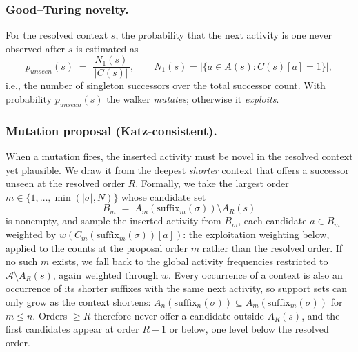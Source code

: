\documentclass[runningheads]{llncs}
\newcommand{\punseen}{\ensuremath{p_{\mathit{unseen}}}}
\begin{document}
\subsubsection{Good--Turing novelty.}
For the resolved context $s$, the probability that the next activity is one never observed after $s$ is estimated as
\begin{equation}
\punseen(s) \;=\; \frac{N_1(s)}{\,|C(s)|\,}, \qquad N_1(s) = |\{a \in A(s) : C(s)[a]=1\}|,
\label{eq:gt}
\end{equation}
i.e., the number of singleton successors over the total successor count. With probability $\punseen(s)$ the walker \emph{mutates}; otherwise it \emph{exploits}.

\subsubsection{Mutation proposal (Katz-consistent).}
When a mutation fires, the inserted activity must be novel in the resolved context yet plausible. We draw it from the deepest \emph{shorter} context that offers a successor unseen at the resolved order $R$. Formally, we take the largest order $m\in\{1,\dots,\min(|\sigma|,N)\}$ whose candidate set
\begin{equation}
B_m \;=\; A_m(\mathrm{suffix}_m(\sigma))\setminus A_R(s)
\label{eq:proposal}
\end{equation}
is nonempty, and sample the inserted activity from $B_m$, each candidate $a\in B_m$ weighted by $w(C_m(\mathrm{suffix}_m(\sigma))[a])$: the exploitation weighting below, applied to the counts at the proposal order $m$ rather than the resolved order. If no such $m$ exists, we fall back to the global activity frequencies restricted to $\mathcal{A}\setminus A_R(s)$, again weighted through $w$. Every occurrence of a context is also an occurrence of its shorter suffixes with the same next activity, so support sets can only grow as the context shortens: $A_n(\mathrm{suffix}_n(\sigma))\subseteq A_m(\mathrm{suffix}_m(\sigma))$ for $m\le n$. Orders $\ge R$ therefore never offer a candidate outside $A_R(s)$, and the first candidates appear at order $R{-}1$ or below, one level below the resolved order.
\end{document}
